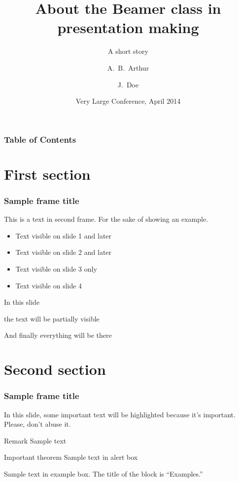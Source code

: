 \documentclass{beamer}
\title[About Beamer] %
{About the Beamer class in presentation making}
\subtitle{A short story}
\author[Arthur, Doe] %
{A.~B.~Arthur\inst{1} \and J.~Doe\inst{2}}
\institute[VFU] %
{
  \inst{1}%
  Faculty of Physics\\
  Very Famous University
  \and
  \inst{2}%
  Faculty of Chemistry\\
  Very Famous University
}
\date[VLC 2014] %
{Very Large Conference, April 2014}
\begin{document}

\maketitle


\begin{frame}
\frametitle{Table of Contents}
\tableofcontents
\end{frame}


\section{First section}


\begin{frame}
\frametitle{Sample frame title}
This is a text in second frame. For the sake of showing an example.

\begin{itemize}
    \item<1-> Text visible on slide 1 and later
    \item<2-> Text visible on slide 2 and later
    \item<3> Text visible on slide 3 only
    \item<4-> Text visible on slide 4
\end{itemize}
\end{frame}


\begin{frame}
In this slide \pause

the text will be partially visible \pause

And finally everything will be there
\end{frame}

\section{Second section}

\begin{frame}
\frametitle{Sample frame title}

In this slide, some important text will be
\alert{highlighted} because it's important.
Please, don't abuse it.

\begin{block}{Remark}
Sample text
\end{block}

\begin{alertblock}{Important theorem}
Sample text in alert box
\end{alertblock}

\begin{examples}
Sample text in example box. The title of the block is ``Examples.''
\end{examples}
\end{frame}
\end{document}

